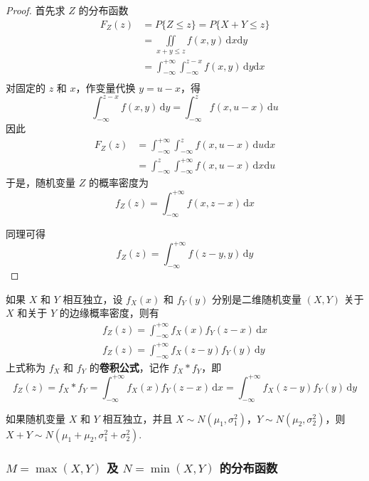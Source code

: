\begin{proof}
    首先求 $Z$ 的分布函数
    $$
    \begin{aligned}
        F_{Z}(z) &= P\{Z \leqslant z\} = P\{X+Y \leqslant z\} \\
        &= \underset{x+y \leqslant z}{\iint} f(x,y) \, \text{d}x \text{d}y \\
        &= \int_{-\infty}^{+\infty} \int_{-\infty}^{z-x} f(x,y) \, \text{d}y \text{d}x \\
    \end{aligned}
    $$
    对固定的 $z$ 和 $x$，作变量代换 $y=u-x$，得
    $$
    \int_{-\infty}^{z-x} f(x,y) \, \text{d}y = \int_{-\infty}^z f(x,u-x) \, \text{d}u
    $$
    因此
    $$
    \begin{aligned}
        F_{Z}(z) &= \int_{-\infty}^{+\infty} \int_{-\infty}^z f(x,u-x) \, \text{d}u \text{d}x \\
        &= \int_{-\infty}^z \int_{-\infty}^{+\infty} f(x,u-x) \, \text{d}x \text{d}u 
    \end{aligned}
    $$
    于是，随机变量 $Z$ 的概率密度为
    $$
    f_{Z}(z) = \int_{-\infty}^{+\infty} f(x,z-x) \, \text{d}x
    $$

    同理可得
    $$
    f_{Z}(z) = \int_{-\infty}^{+\infty} f(z-y,y) \, \text{d}y
    $$
\end{proof}

如果 $X$ 和 $Y$ 相互独立，设 $f_{X}(x)$ 和 $f_{Y}(y)$ 分别是二维随机变量 $(X,Y)$ 关于 $X$ 和关于 $Y$ 的边缘概率密度，则有
\begin{gather*}
    f_{Z}(z) = \int_{-\infty}^{+\infty} f_{X}(x) f_{Y}(z-x) \, \text{d}x \\
    f_{Z}(z) = \int_{-\infty}^{+\infty} f_{X}(z-y) f_{Y}(y) \, \text{d}y
\end{gather*}
上式称为 $f_X$ 和 $f_Y$ 的\textbf{卷积公式}，记作 $f_X * f_Y$，即
\begin{equation}
    f_{Z}(z) = f_X * f_Y = \int_{-\infty}^{+\infty} f_{X}(x) f_{Y}(z-x) \, \text{d}x = \int_{-\infty}^{+\infty} f_{X}(z-y) f_{Y}(y) \, \text{d}y
\end{equation}

\begin{conclusion}
    如果随机变量 $X$ 和 $Y$ 相互独立，并且 $X \sim N(\mu_1,\sigma_1^2)$，$Y \sim N(\mu_2,\sigma_2^2)$，则 $X+Y \sim N(\mu_1 + \mu_2, \sigma_1^2 + \sigma_2^2)$.
\end{conclusion}

\subsubsection{\texorpdfstring{$M = \max(X,Y)$}{} 及 \texorpdfstring{$N = \min(X,Y)$}{} 的分布函数}

